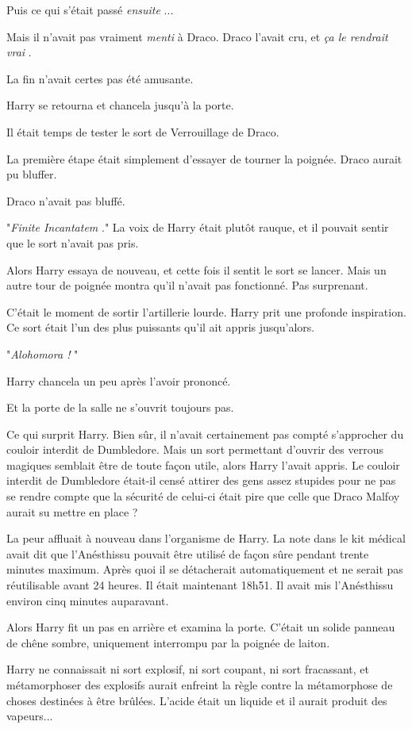 Puis ce qui s'était passé \emph{ensuite} ...

Mais il n'avait pas vraiment \emph{menti}  à Draco. Draco l'avait cru, et \emph{ça le rendrait vrai} .

La fin n'avait certes pas été amusante.

Harry se retourna et chancela jusqu'à la porte.

Il était temps de tester le sort de Verrouillage de Draco.

La première étape était simplement d'essayer de tourner la poignée. Draco aurait pu bluffer.

Draco n'avait pas bluffé.

"\emph{Finite Incantatem} ." La voix de Harry était plutôt rauque, et il pouvait sentir que le sort n'avait pas pris.

Alors Harry essaya de nouveau, et cette fois il sentit le sort se lancer. Mais un autre tour de poignée montra qu'il n'avait pas fonctionné. Pas surprenant.

C'était le moment de sortir l'artillerie lourde. Harry prit une profonde inspiration. Ce sort était l'un des plus puissants qu'il ait appris jusqu'alors.

"\emph{Alohomora !} "

Harry chancela un peu après l'avoir prononcé.

Et la porte de la salle ne s'ouvrit toujours pas.

Ce qui surprit Harry. Bien sûr, il n'avait certainement pas compté s'approcher du couloir interdit de Dumbledore. Mais un sort permettant d'ouvrir des verrous magiques semblait être de toute façon utile, alors Harry l'avait appris. Le couloir interdit de Dumbledore était-il censé attirer des gens assez stupides pour ne pas se rendre compte que la sécurité de celui-ci était pire que celle que Draco Malfoy aurait su mettre en place ?

La peur affluait à nouveau dans l'organisme de Harry. La note dans le kit médical avait dit que l'Anésthissu pouvait être utilisé de façon sûre pendant trente minutes maximum. Après quoi il se détacherait automatiquement et ne serait pas réutilisable avant 24 heures. Il était maintenant 18h51. Il avait mis l'Anésthissu environ cinq minutes auparavant.

Alors Harry fit un pas en arrière et examina la porte. C'était un solide panneau de chêne sombre, uniquement interrompu par la poignée de laiton.

Harry ne connaissait ni sort explosif, ni sort coupant, ni sort fracassant, et métamorphoser des explosifs aurait enfreint la règle contre la métamorphose de choses destinées à être brûlées. L'acide était un liquide et il aurait produit des vapeurs...


